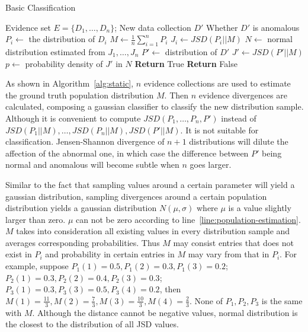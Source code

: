 \documentclass[a4paper]{IEEEtran}
\begin{document}
			\begin{algorithm}[!ht]
				\caption{Basic Classification}
				\label{alg:static}
				\begin{algorithmic}[1]
					\Require Evidence set $E = \{D_1, \dots, D_n\}$; New data collection $D'$
					\Ensure Whether $D'$ is anomalous
						\State $P_i \gets$ the distribution of $D_i$
					\EndFor
					\State $M \gets \frac{1}{n}\sum_{i=1}^{n}P_i$\label{line:population-estimation}
						\State $J_i \gets JSD(P_i||M)$
					\EndFor
					\State $N \gets$ normal distribution estimated from $J_1, \dots, J_n$
					\State $P' \gets$ distribution of $D'$
					\State $J' \gets JSD(P'||M)$
					\State $p \gets$ probability density of $J'$ in $N$
						\State \textbf{Return} True
					\Else
						\State \textbf{Return} False
					\EndIf
				\end{algorithmic}
			\end{algorithm}
		
			As shown in Algorithm~\ref{alg:static}, $n$ evidence collections are used to estimate the ground truth population distribution $M$. Then $n$ evidence divergences are calculated, composing a gaussian classifier to classify the new distribution sample. Although it is convenient to compute $JSD(P_1, \dots, P_n, P')$ instead of $JSD(P_1||M), \dots, JSD(P_n||M), JSD(P'||M)$. It is not suitable for classification. Jensen-Shannon divergence of $n+1$ distributions will dilute the affection of the abnormal one, in which case the difference between $P'$ being normal and anomalous will become subtle when $n$ goes larger.
			
			Similar to the fact that sampling values around a certain parameter will yield a gaussian distribution, sampling divergences around a certain population distribution yields a gaussian distribution $N(\mu, \sigma)$ where $\mu$ is a value slightly larger than zero. $\mu$ can not be zero according to line~\ref{line:population-estimation}. $M$ takes into consideration all existing values in every distribution sample and averages corresponding probabilities. Thus $M$ may consist entries that does not exist in $P_i$ and probability in certain entries in $M$ may vary from that in $P_i$. For example, suppose $P_1(1)=0.5, P_1(2)=0.3, P_1(3)=0.2$; $P_2(1) = 0.3, P_2(2) = 0.4, P_2(3) = 0.3$; $P_3(1)=0.3, P_3(3)=0.5, P_3(4)=0.2$, then $M(1) = \frac{11}{3}, M(2)=\frac{7}{3}, M(3)=\frac{10}{3}, M(4)=\frac{2}{3}$. None of $P_1, P_2, P_3$ is the same with $M$. Although the distance cannot be negative values, normal distribution is the closest to the distribution of all JSD values.
		
\end{document}
